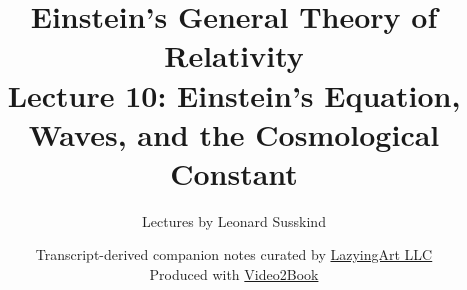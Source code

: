 \documentclass[11pt,oneside]{book}
\begin{document}
\frontmatter
\hypersetup{pageanchor=false}
\title{Einstein's General Theory of Relativity\\[0.45em]
\large Lecture 10: Einstein's Equation, Waves, and the Cosmological Constant}
\author{Lectures by Leonard Susskind}
\date{Transcript-derived companion notes curated by
\href{https://lazying.art}{LazyingArt LLC}\\[0.35em]
\small Produced with
\href{https://github.com/lachlanchen/Video2Book}{Video2Book}}
\maketitle
\hypersetup{pageanchor=true}
\clearpage
\mainmatter

\end{document}
